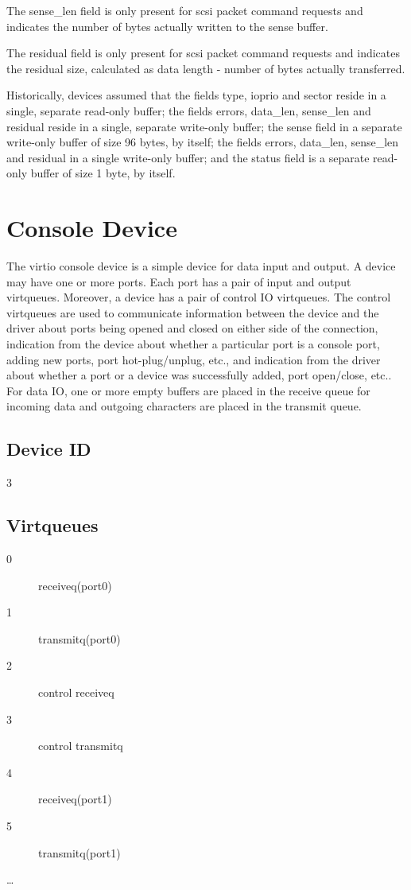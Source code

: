 The sense_len field is only present for scsi packet command
requests and indicates the number of bytes actually written to
the sense buffer.

The residual field is only present for scsi packet command
requests and indicates the residual size, calculated as data
length - number of bytes actually transferred.

Historically, devices assumed that the fields type, ioprio and
sector reside in a single, separate read-only buffer; the fields
errors, data_len, sense_len and residual reside in a single,
separate write-only buffer; the sense field in a separate
write-only buffer of size 96 bytes, by itself; the fields errors,
data_len, sense_len and residual in a single write-only buffer;
and the status field is a separate read-only buffer of size 1
byte, by itself.


\section{Console Device}\label{sec:Device Types / Console Device}

The virtio console device is a simple device for data input and
output. A device may have one or more ports. Each port has a pair
of input and output virtqueues. Moreover, a device has a pair of
control IO virtqueues. The control virtqueues are used to
communicate information between the device and the driver about
ports being opened and closed on either side of the connection,
indication from the device about whether a particular port is a
console port, adding new ports, port hot-plug/unplug, etc., and
indication from the driver about whether a port or a device was
successfully added, port open/close, etc.. For data IO, one or
more empty buffers are placed in the receive queue for incoming
data and outgoing characters are placed in the transmit queue.

\subsection{Device ID}\label{sec:Device Types / Console Device / Device ID}

  3

\subsection{Virtqueues}\label{sec:Device Types / Console Device / Virtqueues}

\begin{description}
\item[0] receiveq(port0)
\item[1] transmitq(port0)
\item[2] control receiveq
\item[3] control transmitq
\item[4] receiveq(port1)
\item[5] transmitq(port1)
\item[\ldots]
\end{description}

